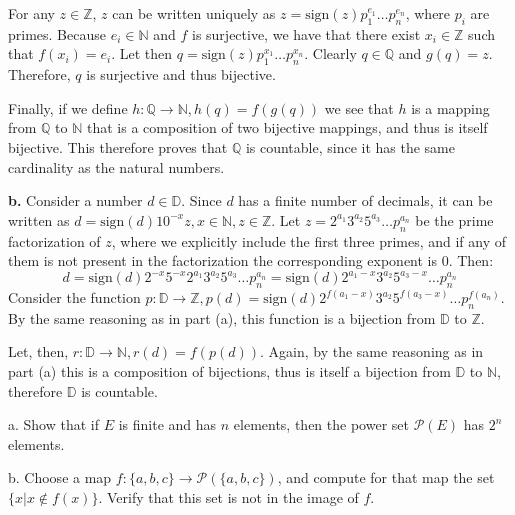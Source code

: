 \begin{solution}
    For any $z \in \mathbb{Z}$, $z$ can be written uniquely as $z = \text{sign}(z)p_1^{e_1}\ldots p_n^{e_n}$, where $p_i$ are primes. Because $e_i \in \mathbb{N}$ and $f$ is surjective, we have that there exist $x_i \in \mathbb{Z}$ such that $f(x_i) = e_i$. Let then $q = \text{sign}(z)p_1^{x_1}\ldots p_n^{x_n}$. Clearly $q \in \mathbb{Q}$ and $g(q) = z$. Therefore, $q$ is surjective and thus bijective.

    Finally, if we define $h:\mathbb{Q} \rightarrow \mathbb{N}, h(q) = f(g(q))$ we see that $h$ is a mapping from $\mathbb{Q}$ to $\mathbb{N}$ that is a composition of two bijective mappings, and thus is itself bijective. This therefore proves that $\mathbb{Q}$ is countable, since it has the same cardinality as the natural numbers.

    \textbf{b.} Consider a number $d \in \mathbb{D}$. Since $d$ has a finite number of decimals, it can be written as $d = \text{sign}(d)10^{-x}z, x \in \mathbb{N}, z \in \mathbb{Z}$. Let $z = 2^{a_1} 3^{a_2} 5^{a_3} \ldots p_n^{a_n}$ be the prime factorization of $z$, where we explicitly include the first three primes, and if any of them is not present in the factorization the corresponding exponent is 0. Then:
    $$d = \text{sign}(d)2^{-x}5^{-x}2^{a_1}3^{a_2}5^{a_3}\ldots p_n^{a_n} = \text{sign}(d)2^{a_1-x}3^{a_2}5^{a_3-x}\ldots p_n^{a_n}$$
    Consider the function $p:\mathbb{D} \rightarrow \mathbb{Z}, p(d) = \text{sign}(d)2^{f(a_1-x)}3^{a_2}5^{f(a_3-x)}\ldots p_n^{f(a_n)}$. By the same reasoning as in part (a), this function is a bijection from $\mathbb{D}$ to $\mathbb{Z}$. 

    Let, then, $r:\mathbb{D} \rightarrow \mathbb{N}, r(d) = f(p(d))$. Again, by the same reasoning as in part (a) this is a composition of bijections, thus is itself a bijection from $\mathbb{D}$ to $\mathbb{N}$, therefore $\mathbb{D}$ is countable.

\end{solution}

\begin{exercise}{2}
    a. Show that if $E$ is finite and has $n$ elements, then the power set $\mathcal{P}(E)$ has $2^n$ elements.

    b. Choose a map $f: \{a, b, c\} \rightarrow \mathcal{P}(\{a, b, c\})$, and compute for that map the set $\{x\rvert x \notin f(x)\}$. Verify that this set is not in the image of $f$.
\end{exercise}

